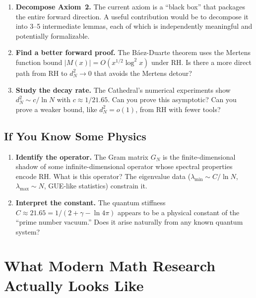 \documentclass[11pt,a4paper]{article}
\begin{document}
\begin{enumerate}
  \item \textbf{Decompose Axiom~2.} The current axiom is a
    ``black box'' that packages the entire forward direction.
    A useful contribution would be to decompose it into 3--5
    intermediate lemmas, each of which is independently
    meaningful and potentially formalizable.

  \item \textbf{Find a better forward proof.} The B\'aez-Duarte
    theorem uses the Mertens function bound $|M(x)| = O(x^{1/2}
    \log^2 x)$ under RH. Is there a more direct path from RH
    to $d_N^2 \to 0$ that avoids the Mertens detour?

  \item \textbf{Study the decay rate.} The Cathedral's numerical
    experiments show $d_N^2 \sim c/\ln N$ with $c \approx
    1/21.65$. Can you prove this asymptotic? Can you prove a
    weaker bound, like $d_N^2 = o(1)$, from RH with fewer tools?
\end{enumerate}

\subsection*{If You Know Some Physics}

\begin{enumerate}
  \item \textbf{Identify the operator.} The Gram matrix $G_N$ is
    the finite-dimensional shadow of some infinite-dimensional
    operator whose spectral properties encode RH. What is this
    operator? The eigenvalue data ($\lambda_{\min} \sim C/\ln N$,
    $\lambda_{\max} \sim N$, GUE-like statistics) constrain it.

  \item \textbf{Interpret the constant.} The quantum stiffness
    $C \approx 21.65 = 1/(2 + \gamma - \ln 4\pi)$ appears to
    be a physical constant of the ``prime number vacuum.'' Does
    it arise naturally from any known quantum system?
\end{enumerate}

\section*{What Modern Math Research Actually Looks Like}
\end{document}

